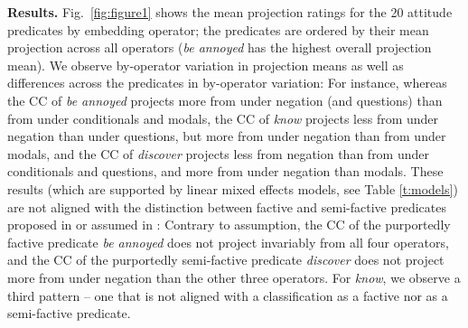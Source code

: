 \documentclass[12pt, a4paper]{article}
\begin{document}




\noindent
{\bf Results.}
	Fig.~\ref{fig:figure1} shows the mean projection ratings for the 20 attitude predicates by embedding operator; the predicates are ordered by their mean projection across all operators (\emph{be annoyed} has the highest overall projection mean). We observe by-operator variation in projection means as well as differences across the predicates in by-operator variation: For instance, whereas the CC of \emph{be annoyed} projects more from under negation (and questions) than from under conditionals and modals, the CC of \emph{know} projects less from under negation than under questions, but more from under negation than from under modals, and the CC of \emph{discover} projects less from negation than from under conditionals and questions, and more from under negation than modals. These results (which are supported by linear mixed effects models, see Table \ref{t:models}) are not aligned with the distinction between factive and semi-factive predicates proposed in \citealt{karttunen_observations_1971} or assumed in \citealt{djarv_cognitive_2018}: Contrary to assumption, the CC of the purportedly factive predicate \emph{be annoyed} does not project invariably from all four operators, and the CC of the purportedly semi-factive predicate \emph{discover} does not project more from under negation than the other three operators. For {\em know}, we observe a third pattern -- one that is not aligned with a classification as a factive nor as a semi-factive predicate. 
\end{document}
